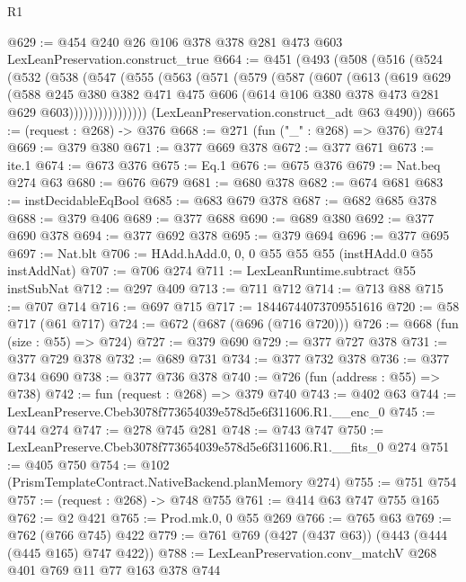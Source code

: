 \begin{lexlean}{R1}
\begin{coremodule}
@629 := @454 @240 @26 @106 @378 @378 @281 @473 @603 LexLeanPreservation.construct_true
@664 := @451
    (@493
      (@508
        (@516
          (@524
            (@532
              (@538
                (@547
                  (@555
                    (@563
                      (@571
                        (@579
                          (@587
                            (@607
                              (@613
                                (@619
                                  @629
                                  (@588
                                    @245
                                    @380
                                    @382
                                    @471
                                    @475
                                    @606
                                    (@614 @106 @380 @378 @473 @281 @629 @603))))))))))))))))
      (LexLeanPreservation.construct_adt @63 @490))
@665 := (request : @268) -> @376
@668 := @271 (fun ("_" : @268) => @376) @274
@669 := @379 @380
@671 := @377 @669 @378
@672 := @377 @671
@673 := ite.{1}
@674 := @673 @376
@675 := Eq.{1}
@676 := @675 @376
@679 := Nat.beq @274 @63
@680 := @676 @679
@681 := @680 @378
@682 := @674 @681
@683 := instDecidableEqBool
@685 := @683 @679 @378
@687 := @682 @685 @378
@688 := @379 @406
@689 := @377 @688
@690 := @689 @380
@692 := @377 @690 @378
@694 := @377 @692 @378
@695 := @379 @694
@696 := @377 @695
@697 := Nat.blt
@706 := HAdd.hAdd.{0, 0, 0} @55 @55 @55 (instHAdd.{0} @55 instAddNat)
@707 := @706 @274
@711 := LexLeanRuntime.subtract @55 instSubNat
@712 := @297 @409
@713 := @711 @712
@714 := @713 @88
@715 := @707 @714
@716 := @697 @715
@717 := 18446744073709551616
@720 := @58 @717 (@61 @717)
@724 := @672 (@687 (@696 (@716 @720)))
@726 := @668 (fun (size : @55) => @724)
@727 := @379 @690
@729 := @377 @727 @378
@731 := @377 @729 @378
@732 := @689 @731
@734 := @377 @732 @378
@736 := @377 @734 @690
@738 := @377 @736 @378
@740 := @726 (fun (address : @55) => @738)
@742 := fun (request : @268) => @379 @740
@743 := @402 @63
@744 := LexLeanPreserve.Cbeb3078f773654039e578d5e6f311606.R1.__enc_0
@745 := @744 @274
@747 := @278 @745 @281
@748 := @743 @747
@750 := LexLeanPreserve.Cbeb3078f773654039e578d5e6f311606.R1.__fits_0 @274
@751 := @405 @750
@754 := @102 (PrismTemplateContract.NativeBackend.planMemory @274)
@755 := @751 @754
@757 := (request : @268) -> @748 @755
@761 := @414 @63 @747 @755 @165
@762 := @2 @421
@765 := Prod.mk.{0, 0} @55 @269
@766 := @765 @63
@769 := @762 (@766 @745) @422
@779 := @761 @769 (@427 (@437 @63)) (@443 (@444 (@445 @165) @747 @422))
@788 := LexLeanPreservation.conv_matchV @268 @401 @769 @11 @77 @163 @378 @744

\end{coremodule}
\end{lexlean}
